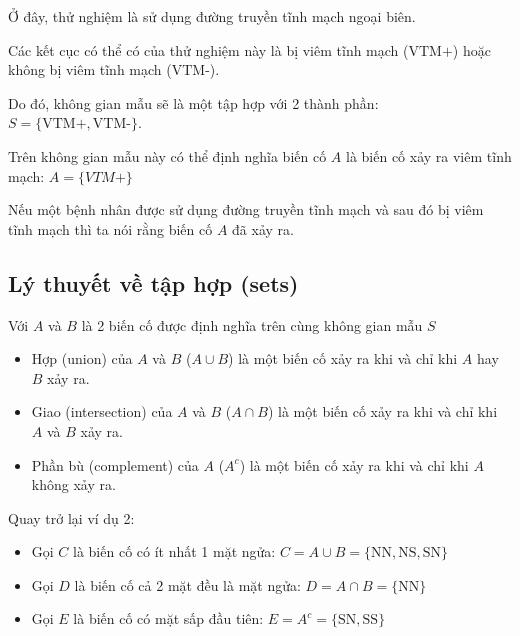 \documentclass[
]{book}
\providecommand{\tightlist}{%
  \setlength{\itemsep}{0pt}\setlength{\parskip}{0pt}}
\begin{document}
Ở đây, thử nghiệm là sử dụng đường truyền tĩnh mạch ngoại biên.

Các kết cục có thể có của thử nghiệm này là bị viêm tĩnh mạch (\(\text{VTM+}\)) hoặc không bị viêm tĩnh mạch (\(\text{VTM-}\)).

Do đó, không gian mẫu sẽ là một tập hợp với 2 thành phần: \(S = \{\text{VTM+},\text{VTM-}\}\).

Trên không gian mẫu này có thể định nghĩa biến cố \(A\) là biến cố xảy ra viêm tĩnh mạch: \(A = \{VTM+\}\)

Nếu một bệnh nhân được sử dụng đường truyền tĩnh mạch và sau đó bị viêm tĩnh mạch thì ta nói rằng biến cố \(A\) đã xảy ra.

\hypertarget{luxfd-thuyux1ebft-vux1ec1-tux1eadp-hux1ee3p-sets}{%
\subsection{Lý thuyết về tập hợp (sets)}\label{luxfd-thuyux1ebft-vux1ec1-tux1eadp-hux1ee3p-sets}}

Với \(A\) và \(B\) là 2 biến cố được định nghĩa trên cùng không gian mẫu \(S\)

\begin{itemize}
\tightlist
\item
  Hợp (union) của \(A\) và \(B\) (\(A \cup B\)) là một biến cố xảy ra khi và chỉ khi \(A\) hay \(B\) xảy ra.
\item
  Giao (intersection) của \(A\) và \(B\) (\(A \cap B\)) là một biến cố xảy ra khi và chỉ khi \(A\) và \(B\) xảy ra.
\item
  Phần bù (complement) của \(A\) (\(A^c\)) là một biến cố xảy ra khi và chỉ khi \(A\) không xảy ra.
\end{itemize}

Quay trở lại ví dụ 2:

\begin{itemize}
\tightlist
\item
  Gọi \(C\) là biến cố có ít nhất 1 mặt ngửa: \(C = A \cup B = \{\text{NN},\text{NS},\text{SN}\}\)
\item
  Gọi \(D\) là biến cố cả 2 mặt đều là mặt ngửa: \(D = A \cap B = \{\text{NN}\}\)
\item
  Gọi \(E\) là biến cố có mặt sấp đầu tiên: \(E = A^c = \{\text{SN},\text{SS}\}\)
\end{itemize}
\end{document}
